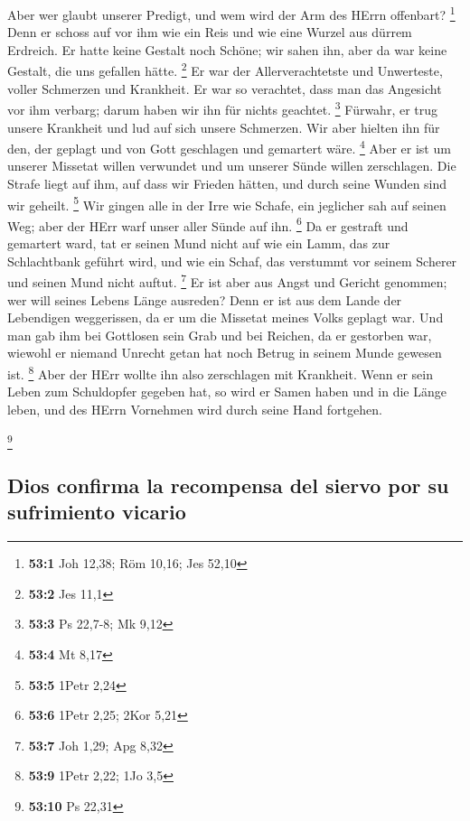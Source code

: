  Aber wer glaubt unserer Predigt, und wem wird der Arm des
HErrn offenbart? \footnote{\textbf{53:1} Joh 12,38; Röm 10,16; Jes 52,10}
 Denn er schoss auf vor ihm wie ein Reis und wie eine
Wurzel aus dürrem Erdreich. Er hatte keine Gestalt noch Schöne; wir
sahen ihn, aber da war keine Gestalt, die uns gefallen hätte.
\footnote{\textbf{53:2} Jes 11,1}  Er war der
Allerverachtetste und Unwerteste, voller Schmerzen und Krankheit. Er war
so verachtet, dass man das Angesicht vor ihm verbarg; darum haben wir
ihn für nichts geachtet. \footnote{\textbf{53:3} Ps 22,7-8; Mk 9,12}
 Fürwahr, er trug unsere Krankheit und lud auf sich unsere
Schmerzen. Wir aber hielten ihn für den, der geplagt und von Gott
geschlagen und gemartert wäre. \footnote{\textbf{53:4} Mt 8,17}
 Aber er ist um unserer Missetat willen verwundet und um
unserer Sünde willen zerschlagen. Die Strafe liegt auf ihm, auf dass wir
Frieden hätten, und durch seine Wunden sind wir geheilt. \footnote{\textbf{53:5}
  1Petr 2,24}  Wir gingen alle in der Irre wie Schafe, ein
jeglicher sah auf seinen Weg; aber der HErr warf unser aller Sünde auf
ihn. \footnote{\textbf{53:6} 1Petr 2,25; 2Kor 5,21}  Da er
gestraft und gemartert ward, tat er seinen Mund nicht auf wie ein Lamm,
das zur Schlachtbank geführt wird, und wie ein Schaf, das verstummt vor
seinem Scherer und seinen Mund nicht auftut. \footnote{\textbf{53:7} Joh
  1,29; Apg 8,32}  Er ist aber aus Angst und Gericht
genommen; wer will seines Lebens Länge ausreden? Denn er ist aus dem
Lande der Lebendigen weggerissen, da er um die Missetat meines Volks
geplagt war.  Und man gab ihm bei Gottlosen sein Grab und
bei Reichen, da er gestorben war, wiewohl er niemand Unrecht getan hat
noch Betrug in seinem Munde gewesen ist. \footnote{\textbf{53:9} 1Petr
  2,22; 1Jo 3,5}  Aber der HErr wollte ihn also
zerschlagen mit Krankheit. Wenn er sein Leben zum Schuldopfer gegeben
hat, so wird er Samen haben und in die Länge leben, und des HErrn
Vornehmen wird durch seine Hand fortgehen.

\footnote{\textbf{53:10} Ps 22,31}

\hypertarget{dios-confirma-la-recompensa-del-siervo-por-su-sufrimiento-vicario}{%
\subsection{Dios confirma la recompensa del siervo por su sufrimiento
vicario}\label{dios-confirma-la-recompensa-del-siervo-por-su-sufrimiento-vicario}}


